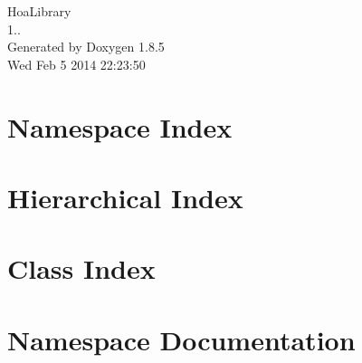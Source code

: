 \documentclass[twoside]{book}
\newcommand{\clearemptydoublepage}{%
  \newpage{\pagestyle{empty}\cleardoublepage}%
}
\begin{document}
\hypersetup{pageanchor=false}
\begin{titlepage}
\vspace*{7cm}
\begin{center}%
{\Large Hoa\-Library \\[1ex]\large 1.. }\\
\vspace*{1cm}
{\large Generated by Doxygen 1.8.5}\\
\vspace*{0.5cm}
{\small Wed Feb 5 2014 22:23:50}\\
\end{center}
\end{titlepage}
\clearemptydoublepage
\tableofcontents
\clearemptydoublepage
{}
\hypersetup{pageanchor=true}

\chapter{Namespace Index}

\chapter{Hierarchical Index}

\chapter{Class Index}

\chapter{Namespace Documentation}

\end{document}
